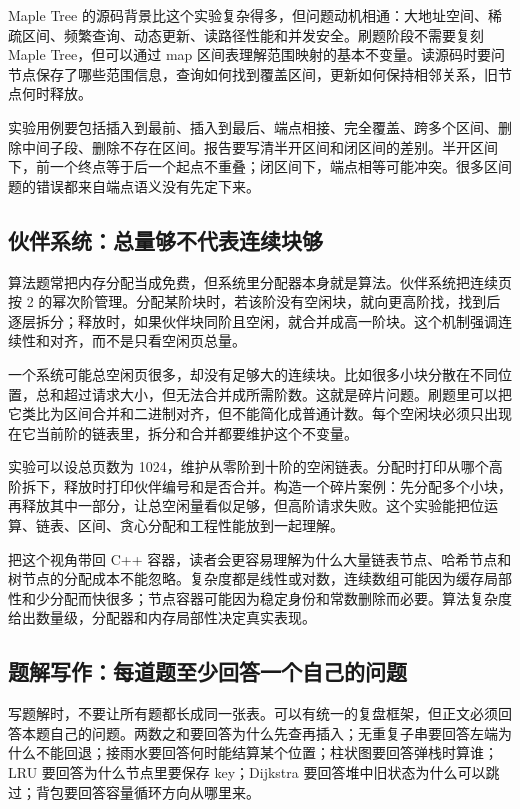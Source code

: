 Maple Tree 的源码背景比这个实验复杂得多，但问题动机相通：大地址空间、稀疏区间、频繁查询、动态更新、读路径性能和并发安全。刷题阶段不需要复刻 Maple Tree，但可以通过 map 区间表理解范围映射的基本不变量。读源码时要问节点保存了哪些范围信息，查询如何找到覆盖区间，更新如何保持相邻关系，旧节点何时释放。

实验用例要包括插入到最前、插入到最后、端点相接、完全覆盖、跨多个区间、删除中间子段、删除不存在区间。报告要写清半开区间和闭区间的差别。半开区间下，前一个终点等于后一个起点不重叠；闭区间下，端点相等可能冲突。很多区间题的错误都来自端点语义没有先定下来。

\subsection{伙伴系统：总量够不代表连续块够}

算法题常把内存分配当成免费，但系统里分配器本身就是算法。伙伴系统把连续页按 2 的幂次阶管理。分配某阶块时，若该阶没有空闲块，就向更高阶找，找到后逐层拆分；释放时，如果伙伴块同阶且空闲，就合并成高一阶块。这个机制强调连续性和对齐，而不是只看空闲页总量。

一个系统可能总空闲页很多，却没有足够大的连续块。比如很多小块分散在不同位置，总和超过请求大小，但无法合并成所需阶数。这就是碎片问题。刷题里可以把它类比为区间合并和二进制对齐，但不能简化成普通计数。每个空闲块必须只出现在它当前阶的链表里，拆分和合并都要维护这个不变量。

实验可以设总页数为 1024，维护从零阶到十阶的空闲链表。分配时打印从哪个高阶拆下，释放时打印伙伴编号和是否合并。构造一个碎片案例：先分配多个小块，再释放其中一部分，让总空闲量看似足够，但高阶请求失败。这个实验能把位运算、链表、区间、贪心分配和工程性能放到一起理解。

把这个视角带回 C++ 容器，读者会更容易理解为什么大量链表节点、哈希节点和树节点的分配成本不能忽略。复杂度都是线性或对数，连续数组可能因为缓存局部性和少分配而快很多；节点容器可能因为稳定身份和常数删除而必要。算法复杂度给出数量级，分配器和内存局部性决定真实表现。

\subsection{题解写作：每道题至少回答一个自己的问题}

写题解时，不要让所有题都长成同一张表。可以有统一的复盘框架，但正文必须回答本题自己的问题。两数之和要回答为什么先查再插入；无重复子串要回答左端为什么不能回退；接雨水要回答何时能结算某个位置；柱状图要回答弹栈时算谁；LRU 要回答为什么节点里要保存 key；Dijkstra 要回答堆中旧状态为什么可以跳过；背包要回答容量循环方向从哪里来。

